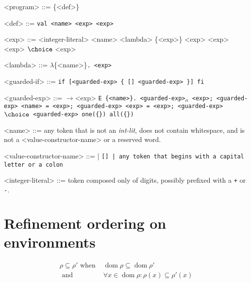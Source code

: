 \documentclass[]{article}
\DeclareMathOperator{\dom}{dom}
\begin{document}
\begin{grammar}
    <program> ::= \{{<def>}\}
    
    <def> ::= \tt{val} <name> <exp>
        \alt <exp>
    
        
        
        <exp> ::= <integer-literal>
        \alt <name>
        \alt <lambda>
         \{<exp>\}
        \alt <exp> <exp>
        \alt <exp> $\choice$ <exp>
        
        
        <lambda> ::= $\lambda$\{<name>\}\tt{.} <exp>
        
        <guarded-if> ::= \tt{if}  [<guarded-exp> \{ [] <guarded-exp> \}] \tt{fi}
        
        
        <guarded-exp> ::= $\boldsymbol{\rightarrow}$<exp>
        \alt  \tt{E} \{<name>\}\tt{.} <guarded-exp>${}_{\alpha}$
        \alt  <exp>\tt{;} <guarded-exp>
        \alt   <name> \tt{=} <exp>\tt{;} <guarded-exp>
        \alt   <exp> \tt{=} <exp>\tt{;} <guarded-exp>
         $\choice$ <guarded-exp> 
        \alt   \tt{one}(\{<guarded-exp>\})
        \alt   \tt{all}(\{<guarded-exp>\})
        
        <name> ::= any token that is not an \textit{int-lit}, does not contain 
        whitespace,
        and is not a <value-constructor-name> or a reserved word.

        <value-constructor-name> ::= \cons | \tt{[]} | any token that begins
        with a capital letter or a colon
    
        <integer-literal> ::= token composed only of digits, possibly prefixed with a \texttt{+} or \texttt{-}.
    
    \end{grammar}




        
\section{Refinement ordering on environments}

\begin{align*}
\rho \subseteq \rho' \text{ when }&\dom\rho  \subseteq \dom \rho'\\
\text{ and } &\forall x \in \dom \rho: \rho(x) \subseteq \rho'(x)
\end{align*}
\end{document}
